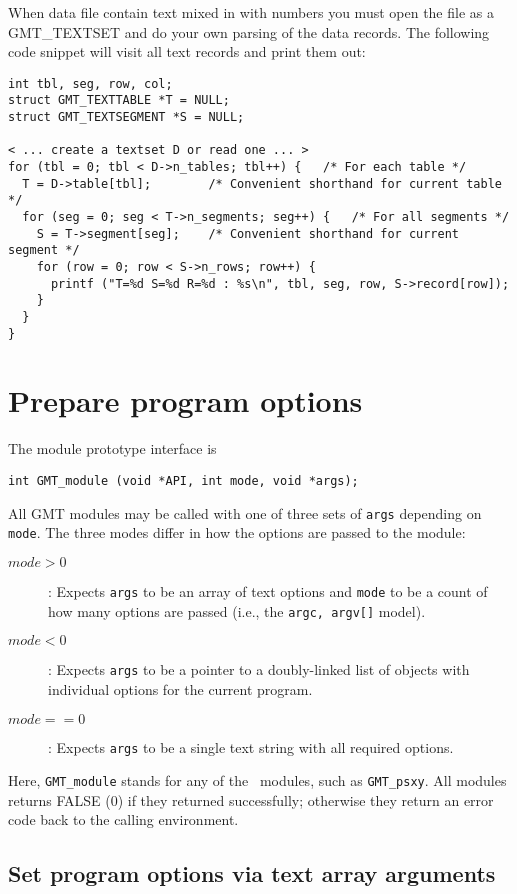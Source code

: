 \documentclass[11pt]{report}
\begin{document}
When data file contain text mixed in with numbers you must open the
file as a GMT\_TEXTSET and do your own parsing of the data records.
The following code snippet will visit all text records and print
them out:

\begin{verbatim}
int tbl, seg, row, col;
struct GMT_TEXTTABLE *T = NULL;
struct GMT_TEXTSEGMENT *S = NULL;

< ... create a textset D or read one ... >
for (tbl = 0; tbl < D->n_tables; tbl++) {	/* For each table */
  T = D->table[tbl];        /* Convenient shorthand for current table */
  for (seg = 0; seg < T->n_segments; seg++) {	/* For all segments */
    S = T->segment[seg];    /* Convenient shorthand for current segment */
    for (row = 0; row < S->n_rows; row++) {
      printf ("T=%d S=%d R=%d : %s\n", tbl, seg, row, S->record[row]);
    }
  }
}
\end{verbatim}

\section{Prepare program options}
\label{sec:func}
The module prototype interface is

\begin{verbatim}
int GMT_module (void *API, int mode, void *args);
\end{verbatim}
All GMT modules may be called with one of three sets of \texttt{args} depending on \texttt{mode}.
The three modes differ in how the options are passed to the module:
\begin{description}
\item [$mode > 0$]: Expects \texttt{args} to be an array of text options and \texttt{mode} to be a count of
how many options are passed (i.e., the \texttt{argc, argv[]} model).
\item [$mode < 0$]: Expects \texttt{args} to be a pointer to a doubly-linked list of objects with individual options
for the current program.
\item [$mode == 0$]: Expects \texttt{args} to be a single text string with all required options.
\end{description}
Here, \texttt{GMT\_module} stands for any of the \GMT\ modules, such as \texttt{GMT\_psxy}.
All modules returns FALSE (0) if they returned successfully; otherwise they return an error code
back to the calling environment.

\subsection{Set program options via text array arguments}
\end{document}
